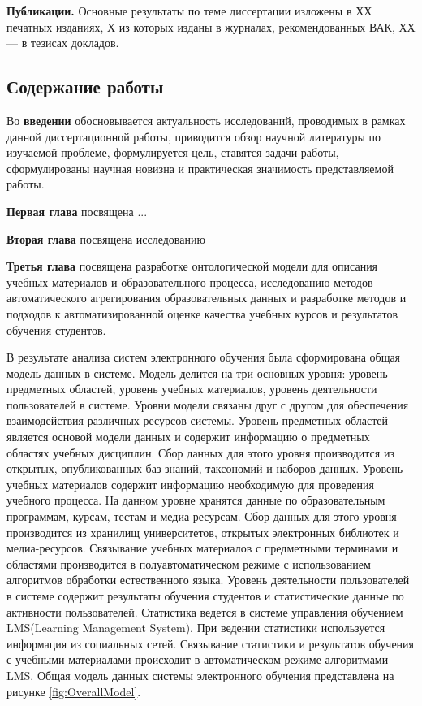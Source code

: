 
\textbf{Публикации.} Основные результаты по теме диссертации изложены в ХХ печатных изданиях, Х из которых изданы в журналах, рекомендованных ВАК, ХХ --- в тезисах докладов.


\subsection*{\Large Содержание работы}
Во \textbf{введении} обосновывается актуальность исследований, проводимых в рамках данной диссертационной работы, приводится обзор научной литературы по изучаемой проблеме, формулируется цель, ставятся задачи работы, сформулированы научная новизна и практическая значимость представляемой работы.

\textbf{Первая глава} посвящена ...

\textbf{Вторая глава} посвящена исследованию 

\textbf{Третья глава} посвящена разработке онтологической модели для описания учебных материалов и образовательного процесса, исследованию методов автоматического агрегирования образовательных данных и разработке методов и подходов к автоматизированной оценке качества учебных курсов и результатов обучения студентов.  

В результате анализа систем электронного обучения была сформирована общая модель данных в системе. Модель делится на три основных уровня: уровень предметных областей, уровень учебных материалов, уровень деятельности пользователей в системе. Уровни модели связаны друг с другом для обеспечения взаимодействия различных ресурсов системы. Уровень предметных областей является основой модели данных и содержит информацию о предметных областях учебных дисциплин. Сбор данных для этого уровня производится из открытых, опубликованных баз знаний, таксономий и наборов данных. Уровень учебных материалов содержит информацию необходимую для проведения учебного процесса. На данном уровне хранятся данные по образовательным программам, курсам, тестам и медиа-ресурсам. Сбор данных для этого уровня производится из хранилищ университетов, открытых электронных библиотек и медиа-ресурсов. Связывание учебных материалов с предметными терминами и областями производится в полуавтоматическом режиме с использованием алгоритмов обработки естественного языка. Уровень деятельности пользователей в системе содержит результаты обучения студентов и  статистические данные по активности пользователей. Статистика ведется в системе управления обучением LMS(Learning Management System). При ведении статистики используется информация из социальных сетей. Связывание статистики и результатов обучения с учебными материалами происходит в автоматическом режиме алгоритмами LMS. Общая модель данных системы электронного обучения представлена на рисунке \ref{fig:OverallModel}. 

